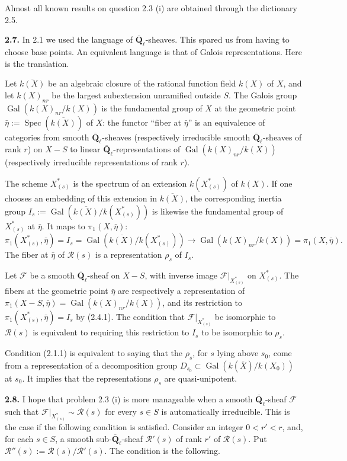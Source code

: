 \documentclass[11pt]{article}
\newcommand{\Qbl}{\overline{\mathbf{Q}}_{\ell}}
\newcommand{\Spec}{\operatorname{Spec}}
\newcommand{\Gal}{\operatorname{Gal}}
\newcommand{\Rcal}{\mathcal{R}}
\newcommand{\Fcal}{\mathcal{F}}
\newcommand{\para}[1]{\medskip\noindent\textbf{#1}\enspace}
\begin{document}
Almost all known results on question 2.3 (i) are obtained through the dictionary 2.5.

\para{2.7.} In 2.1 we used the language of \(\Qbl\)-sheaves. This spared us from having to choose base points. An equivalent language is that of Galois representations. Here is the translation.

Let \(\overline{k(X)}\) be an algebraic closure of the rational function field \(k(X)\) of \(X\), and let \(k(X)_{nr}\) be the largest subextension unramified outside \(S\). The Galois group \(\Gal(k(X)_{nr}/k(X))\) is the fundamental group of \(X\) at the geometric point \(\bar\eta:=\Spec(\overline{k(X)})\) of \(X\): the functor ``fiber at \(\bar\eta\)'' is an equivalence of categories from smooth \(\Qbl\)-sheaves (respectively irreducible smooth \(\Qbl\)-sheaves of rank \(r\)) on \(X-S\) to linear \(\Qbl\)-representations of \(\Gal(k(X)_{nr}/k(X))\) (respectively irreducible representations of rank \(r\)).

The scheme \(X^*_{(s)}\) is the spectrum of an extension \(k(X^*_{(s)})\) of \(k(X)\). If one chooses an embedding of this extension in \(\overline{k(X)}\), the corresponding inertia group \(I_s:=\Gal(\overline{k(X)}/k(X^*_{(s)}))\) is likewise the fundamental group of \(X^*_{(s)}\) at \(\bar\eta\). It maps to \(\pi_1(X,\bar\eta)\):
\begin{equation}
\pi_1(X^*_{(s)},\bar\eta)=I_s=\Gal(\overline{k(X)}/k(X^*_{(s)}))\longrightarrow \Gal(k(X)_{nr}/k(X))=\pi_1(X,\bar\eta).
\tag{2.7.1}
\end{equation}
The fiber at \(\bar\eta\) of \(\Rcal(s)\) is a representation \(\rho_s\) of \(I_s\).

Let \(\Fcal\) be a smooth \(\Qbl\)-sheaf on \(X-S\), with inverse image \(\Fcal|_{X^*_{(s)}}\) on \(X^*_{(s)}\). The fibers at the geometric point \(\bar\eta\) are respectively a representation of \(\pi_1(X-S,\bar\eta)=\Gal(k(X)_{nr}/k(X))\), and its restriction to \(\pi_1(X^*_{(s)},\bar\eta)=I_s\) by (2.4.1). The condition that \(\Fcal|_{X^*_{(s)}}\) be isomorphic to \(\Rcal(s)\) is equivalent to requiring this restriction to \(I_s\) to be isomorphic to \(\rho_s\).

Condition (2.1.1) is equivalent to saying that the \(\rho_s\), for \(s\) lying above \(s_0\), come from a representation of a decomposition group \(D_{s_0}\subset \Gal(k(\overline X)/k(X_0))\) at \(s_0\). It implies that the representations \(\rho_s\) are quasi-unipotent.

\para{2.8.} I hope that problem 2.3 (i) is more manageable when a smooth \(\Qbl\)-sheaf \(\Fcal\) such that \(\Fcal|_{X^*_{(s)}}\sim\Rcal(s)\) for every \(s\in S\) is automatically irreducible. This is the case if the following condition is satisfied. Consider an integer \(0<r'<r\), and, for each \(s\in S\), a smooth sub-\(\Qbl\)-sheaf \(\Rcal'(s)\) of rank \(r'\) of \(\Rcal(s)\). Put \(\Rcal''(s):=\Rcal(s)/\Rcal'(s)\). The condition is the following.
\end{document}
